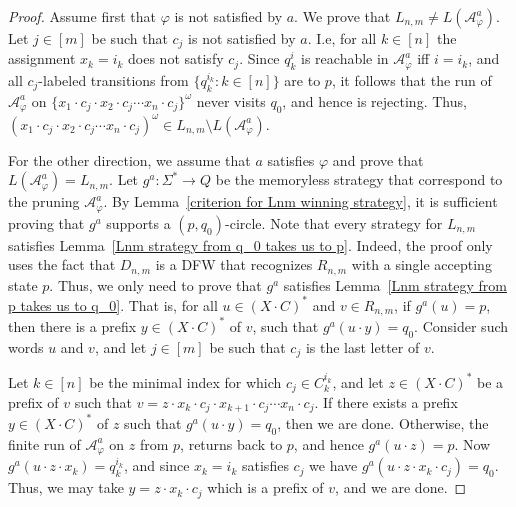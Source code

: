 \documentclass[10pt,a4paper]{amsart}
\theoremstyle{definition}
\numberwithin{equation}{section}
\newcommand{\A}{{\mathcal A}}
\begin{document}
\begin{proof}
	Assume first that $\varphi$ is not satisfied by $a$. We prove that $L_{n,m}\neq L(\A^{a}_\varphi)$. Let $j\in [m]$ be such that $c_j$ is not satisfied by $a$. I.e, for all $k\in [n]$ the assignment $x_k=i_k$ does not satisfy $c_j$. Since $q^i_k$ is reachable in $\A_\varphi^{a}$ iff $i=i_k$, and all $c_j$-labeled transitions from $\{q^{i_k}_k : k\in[n]\}$ are to $p$, it follows that the run of $\A_\varphi^{a}$ on $\{x_1\cdot c_j\cdot x_2\cdot c_j\cdots x_n\cdot c_j\}^\omega$ never visits $q_0$, and hence is rejecting. Thus, $(x_1\cdot c_j\cdot x_2\cdot c_j\cdots x_n\cdot c_j)^\omega\in L_{n,m}\setminus L(\A_\varphi^{a})$.
	
	For the other direction, we assume that $a$ satisfies $\varphi$ and prove that $L(\A_\varphi^{a})=L_{n,m}$. Let $g^{a}:\Sigma^*\rightarrow Q$ be the memoryless strategy that correspond to the pruning $\A^{a}_\varphi$. By Lemma~\ref{criterion for Lnm winning strategy}, it is sufficient proving that $g^a$ supports a $(p,q_0)$-circle. Note that every strategy for $L_{n,m}$ satisfies Lemma~\ref{Lnm strategy from q_0 takes us to p}. Indeed, the proof only uses the fact that $D_{n,m}$ is a DFW that recognizes $R_{n,m}$ with a single accepting state $p$. Thus, we only need to prove that $g^a$ satisfies Lemma~\ref{Lnm strategy from p takes us to q_0}. That is, for all $u\in (X\cdot C)^*$ and $v\in R_{n,m}$, if $g^{a}(u)=p$, then there is a prefix $y\in (X\cdot C)^*$ of $v$, such that $g^{a}(u\cdot y)=q_0$. Consider such words $u$ and $v$, and let $j\in [m]$ be such that $c_j$ is the last letter of $v$. 
	
		Let $ k\in [n]$ be the minimal index for which $c_j\in C^{i_k}_k$, 
	and let $z\in (X\cdot C)^*$ be a prefix of $v$ such that $v=z\cdot x_k\cdot c_j\cdot x_{k+1}\cdot c_j\cdots x_n\cdot c_j$. If there exists a prefix $y\in (X\cdot C)^*$ of $ z$ such that $g^{a}(u\cdot y)=q_0$, then we are done. Otherwise, the finite run of $\A_\varphi^{a}$ on $ z $ from $ p $, returns back to $ p $, and hence $g^{a}(u\cdot z)=p$. Now $g^{a}(u\cdot z\cdot x_k)=q^{i_k}_k$, and since $x_k=i_k$ satisfies $c_j$ we have $g^{a}(u\cdot z\cdot x_k\cdot c_j)=q_0$. Thus, we may take $y=z\cdot x_k\cdot c_j$ which is a prefix of $v$, and we are done.
\end{proof}

 
\end{document}
